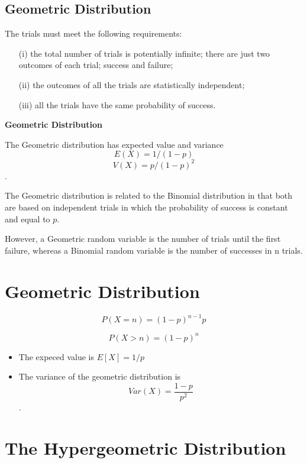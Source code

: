 \documentclass[]{report}
\begin{document}
\subsection{Geometric Distribution}

The trials must meet the following requirements:

\begin{itemize}
\item[(i)] the total number of trials is potentially infinite;
there are just two outcomes of each trial; success and failure;
\item[(ii)] the outcomes of all the trials are statistically independent;
\item[(iii)] all the trials have the same probability of success.
\end{itemize}


\noindent \textbf{Geometric Distribution}

The Geometric distribution has expected value and variance  \[E(X)= 1/(1-p)\] \[V(X)=p/{(1-p)^2}\].

The Geometric distribution is related to the Binomial distribution in that both are based on independent trials in which the probability of success is constant and equal to $p$. 

However, a Geometric random variable is the number of trials until the first failure, whereas a Binomial random variable is the number of successes in n trials.


\section{Geometric Distribution}

\[ P(X = n) = (1-p)^{n-1}p \]

\[ P(X > n) = (1-p)^n \]



\begin{itemize}
\item The expeced value is $ E[X] = 1/p $

\item The variance of the geometric distribution is 
\[Var(X) = \frac{1-p}{p^2}\].

\end{itemize}

\section{The Hypergeometric Distribution }
\end{document}

